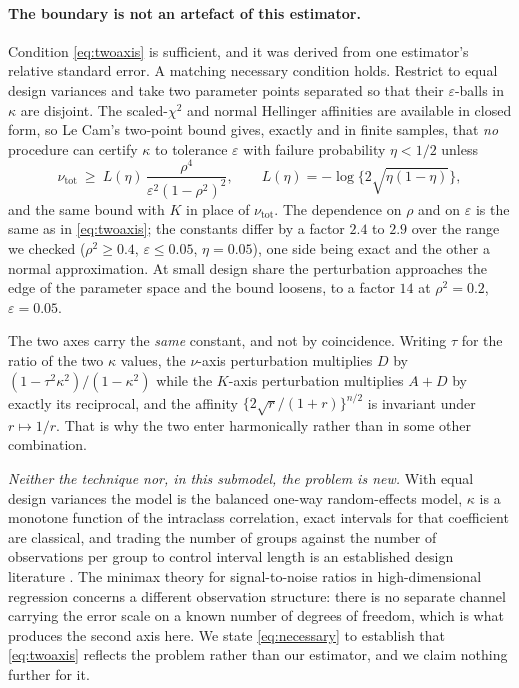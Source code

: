 \paragraph{The boundary is not an artefact of this estimator.} Condition
\eqref{eq:twoaxis} is sufficient, and it was derived from one estimator's
relative standard error. A matching necessary condition holds. Restrict to equal
design variances and take two parameter points separated so that their
$\varepsilon$-balls in $\kappa$ are disjoint. The scaled-$\chi^2$ and normal
Hellinger affinities are available in closed form, so Le Cam's two-point bound \citep{lecam1986}
gives, exactly and in finite samples, that \emph{no} procedure can certify
$\kappa$ to tolerance $\varepsilon$ with failure probability $\eta<1/2$ unless
\begin{equation}\label{eq:necessary}
\nu_{\mathrm{tot}}\ \ge\ L(\eta)\,\frac{\rho^4}{\varepsilon^2(1-\rho^2)^2},
\qquad L(\eta)=-\log\big\{2\sqrt{\eta(1-\eta)}\big\},
\end{equation}
and the same bound with $K$ in place of $\nu_{\mathrm{tot}}$. The dependence on
$\rho$ and on $\varepsilon$ is the same as in \eqref{eq:twoaxis}; the constants
differ by a factor $2.4$ to $2.9$ over the range we checked ($\rho^2\ge0.4$,
$\varepsilon\le0.05$, $\eta=0.05$), one side being exact and the other a normal
approximation. At small design share the perturbation approaches the edge of the
parameter space and the bound loosens, to a factor $14$ at $\rho^2=0.2$,
$\varepsilon=0.05$.

The two axes carry the \emph{same} constant, and not by coincidence. Writing
$\tau$ for the ratio of the two $\kappa$ values, the $\nu$-axis perturbation
multiplies $D$ by $(1-\tau^2\kappa^2)/(1-\kappa^2)$ while the $K$-axis
perturbation multiplies $A+D$ by exactly its reciprocal, and the affinity
$\{2\sqrt r/(1+r)\}^{n/2}$ is invariant under $r\mapsto 1/r$. That is why the two
enter harmonically rather than in some other combination.

\emph{Neither the technique nor, in this submodel, the problem is new.} With
equal design variances the model is the balanced one-way random-effects model,
$\kappa$ is a monotone function of the intraclass correlation, exact intervals
for that coefficient are classical, and trading the number of groups against the
number of observations per group to control interval length is an established
design literature \citep{donner1986,zou2012icc,mondal2024review}. The
minimax theory for signal-to-noise ratios in high-dimensional regression
\citep{verzelen2018snr} concerns a different observation structure: there is no
separate channel carrying the error scale on a known number of degrees of
freedom, which is what produces the second axis here. We state
\eqref{eq:necessary} to establish that \eqref{eq:twoaxis} reflects the problem
rather than our estimator, and we claim nothing further for it.

